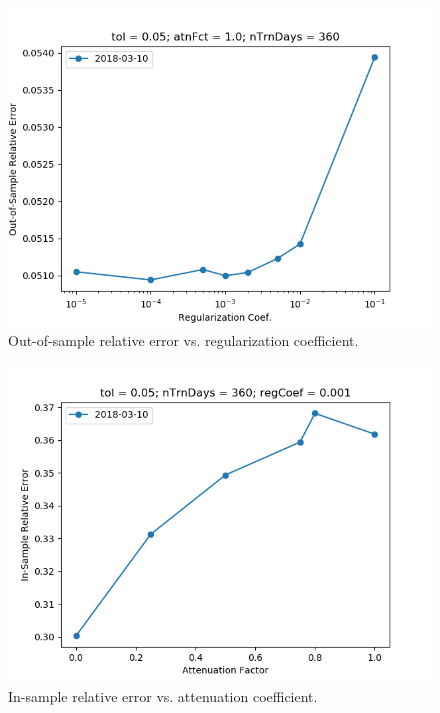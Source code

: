 \documentclass{article}
\begin{document}
\begin{figure}\label{fig:regCoef-sensitivity-oos-error}
\includegraphics[width = \textwidth]{figures/regCoef-sensitivity-oos-error.png}
\caption{Out-of-sample relative error vs. regularization coefficient.}
\end{figure}

\begin{figure}\label{fig:atnFct-sensitivity-error}
\includegraphics[width = \textwidth]{figures/atnFct-sensitivity-error.png}
\caption{In-sample relative error vs. attenuation coefficient.}
\end{figure}
\end{document}
